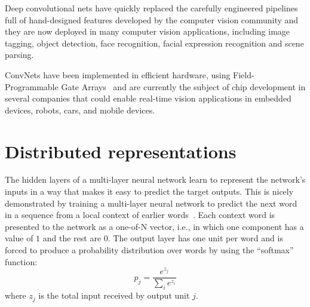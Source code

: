 \documentclass[10pts]{article}
\begin{document}
Deep convolutional nets have quickly replaced the carefully engineered
pipelines full of hand-designed features developed by the computer
vision community and they are now deployed in many computer vision
applications, including image tagging, object detection, face
recognition, facial expression recognition and scene parsing.

ConvNets have been implemented in efficient hardware, using
Field-Programmable Gate Arrays~\citep{farabet-suml-11} and are
currently the subject of chip development in several companies that
could enable real-time vision applications in embedded devices,
robots, cars, and mobile devices.



\section{Distributed representations}

The hidden layers of a multi-layer neural network learn to represent
the network's inputs in a way that makes it easy to predict the target
outputs. This is nicely demonstrated by training a multi-layer neural
network to predict the next word in a sequence from a local context of
earlier words~\citep{BenDucVin01-short}.  Each context word is
presented to the network as a one-of-N vector, i.e., in which one
component has a value of $1$ and the rest are $0$. The output layer
has one unit per word and is forced to produce a probability
distribution over words by using the ``softmax'' function:
\begin{equation}
p_j = \frac{e^{z_j}}{\sum_i e^{z_i}}
\end{equation}
where $z_j$ is the total input received by output unit $j$. 

\end{document}
